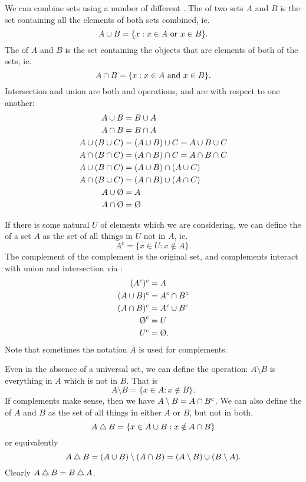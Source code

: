 We can combine sets using a number of different .  The
 of two sets $A$ and $B$ is the set containing all the elements
of both sets combined, ie.
\[
  A \cup B = \{ x : x \in A \text{ or } x \in B\}.
\]
The  of $A$ and $B$ is the set containing the objects that
are elements of both of the sets, ie.
\[
  A \cap B = \{ x : x \in A \text{ and } x \in B\}.
\]
Intersection and union are both  and 
operations, and are  with respect to one another:
\begin{align*}
  A \union B  &= B \union A\\
  A \intersect B  &= B \intersect A\\
  A \union (B \union C) &= (A \union B) \union C = A \union B \union C\\
  A \intersect (B \intersect C) &= (A \intersect B) \intersect C = A \intersect B \intersect
C\\
  A \union (B \intersect C) &= (A \union B) \intersect (A \union C)\\
  A \intersect (B \union C) &= (A \intersect B) \union (A \intersect C)\\
  A \union \emptyset &= A\\
  A \intersect \emptyset &= \emptyset
\end{align*}

If there is some natural  $U$ of elements which we are
considering, we can define the  of a set $A$ as the set of all
things in $U$ not in $A$, ie.
\[
  A^{c} = \{x \in U : x \notin A \}.
\]
The complement of the complement is the original set, and complements
interact with union and intersection via :
\begin{align*}
  (A^{c})^{c} &= A\\
  (A \union B)^{c} &= A^{c} \intersect B^{c}\\
  (A \intersect B)^{c} &= A^{c} \union B^{c}\\
  \emptyset^{c} &= U \\
  U^{c} &= \emptyset.
\end{align*}
Note that sometimes the notation $\overline{A}$ is used for complements.

Even in the absence of a universal set, we can define the  operation: $A \setminus B$ is everything in $A$ which is not in
$B$.  That is
\[
  A \setminus B = \{ x \in A : x \notin B\}.
\]
If complements make sense, then we have $A \setminus B = A \cap
B^{c}$.  We can also define the  of $A$ and $B$
as the set of all things in either $A$ or $B$, but not in both,
\[
  A \bigtriangleup B = \{x \in A \cup B : x \notin A \cap B\}
\]
or equivalently
\[
  A \bigtriangleup B = (A \cup B) \setminus (A \cap B) = (A \setminus B)
\cup (B \setminus A).
\]
Clearly $A \bigtriangleup B = B \bigtriangleup A$.

